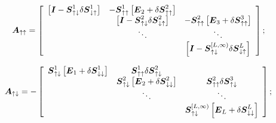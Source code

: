 \[
{\bmi A}_{ \uparrow \uparrow }=\left[{\begin{array}{ccc}\left[{{\bmi I}-{\bmi S}_{ 
\uparrow \downarrow }^{1} {\mit \delta} {  \bmi S}_{\downarrow \uparrow 
}^{  1}}\right]&-{\bmi S}_{ \uparrow \uparrow }^{1} 
\left[{\bmi E}_{2}+{\mit \delta} {  \bmi S}_{ \uparrow \uparrow }^{ 2}\right]&\\ &\left[{  {\bmi I}-{\bmi S}_{ 
\uparrow \downarrow }^{2} {\mit \delta} {  \bmi S}_{\downarrow \uparrow 
}^{  2}}\right]&  -{\bmi S}_{ \uparrow \uparrow }^{2} 
\left[{\bmi E}_{3}+{\mit \delta} {\bmi S}_{ \uparrow \uparrow }^{3}\right]\\ 
&\ddots &\ddots  \\ 
&&\left[{{\bmi I}-{\bmi S}_{ \uparrow \downarrow }^{[L, \infty   )} 
{\mit \delta} {  \bmi S}_{\downarrow \uparrow }^{  
L}}\right]\end{array}}\right];
\] 

\[
{\bmi A}_{ \uparrow \downarrow }=-\left[{\begin{array}{ccc}{\bmi S}_{ \uparrow 
\downarrow }^{1} 
\left[{\bmi E}_{1}+{\mit \delta} {  \bmi S}_{ \downarrow \downarrow }^{1}\right]&
{  \bmi S}_{\uparrow \uparrow }^{  1}{\mit \delta} {  
\bmi S}_{\uparrow \downarrow }^{  2}&\\ &{  \bmi S}_{\uparrow 
\downarrow }^{  2}\left[{\bmi E}_{2}+{\mit \delta} {  \bmi S}_{ \downarrow 
\downarrow }^{2}\right]&{  \bmi S}_{\uparrow \uparrow }^{  2}{\mit \delta} {  
\bmi S}_{\uparrow \downarrow }^{  3}\\ &\ddots  &\ddots\\ &&{\bmi S}_{ \uparrow 
\downarrow }^{[L, \infty)} \left[{\bmi E}_{L}+{\mit \delta} {  \bmi S}_{ 
\downarrow \downarrow }^{L}\right]\end{array}}\right];
\] 



